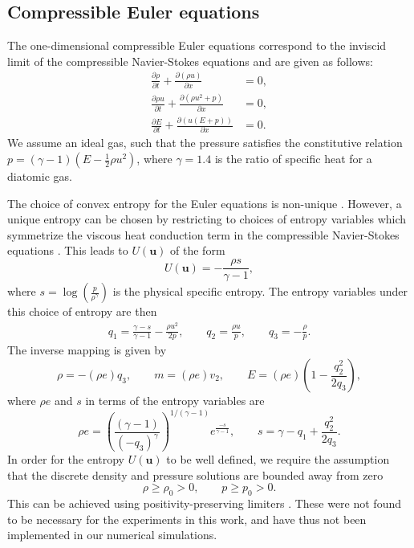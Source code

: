 \documentclass[preprint,10pt]{article}
\theoremstyle{definition}
\theoremstyle{lemma}
\theoremstyle{theorem}
\theoremstyle{assumption}
\newcommand{\pd}[2]{\frac{\partial#1}{\partial#2}}
\newcommand{\LRp}[1]{\left( #1 \right)}
\begin{document}
\subsection{Compressible Euler equations}

The one-dimensional compressible Euler equations correspond to the inviscid limit of the compressible Navier-Stokes equations and are given as follows:
\begin{align*}
\pd{\rho}{t} + \pd{\LRp{\rho u}}{x} &= 0,\\
\pd{\rho u}{t} + \pd{\LRp{\rho u^2 + p }}{x} &= 0,\\
\pd{E}{t} + \pd{\LRp{u(E+p)}}{x} &= 0.
\end{align*}
We assume an ideal gas, such that the pressure satisfies the constitutive relation $p = (\gamma-1)\LRp{E - \frac{1}{2}\rho u^2}$, where $\gamma = 1.4$ is the ratio of specific heat for a diatomic gas.    

The choice of convex entropy for the Euler equations is non-unique \cite{harten1983symmetric}.  However, a unique entropy can be chosen by restricting to choices of entropy variables which symmetrize the viscous heat conduction term in the compressible Navier-Stokes equations \cite{hughes1986new}.  This leads to $U(\bm{u})$ of the form
\[
U(\bm{u}) = -\frac{\rho s}{\gamma-1},
\]
where $s = \log\LRp{\frac{p}{\rho^\gamma}}$ is the physical specific entropy.  The entropy variables under this choice of entropy are then
\begin{align*}
q_1 = \frac{\gamma-s}{\gamma-1} - \frac{\rho u^2}{2p}, \qquad q_2 = \frac{\rho u}{p}, \qquad q_3 = -\frac{\rho}{p}.
\end{align*}
The inverse mapping is given by 
\[
\rho = -(\rho e) q_3, \qquad m = (\rho e) v_2, \qquad E = (\rho e)\LRp{1 - \frac{q_2^2}{2 q_3}},
\]
where $\rho e$ and $s$ in terms of the entropy variables are 
\[
\rho e = \LRp{\frac{(\gamma-1)}{\LRp{-q_3}^{\gamma}}}^{1/(\gamma-1)}e^{\frac{-s}{\gamma-1}}, \qquad s = \gamma - q_1 + \frac{q_2^2}{2q_3}.
\]
In order for the entropy $U(\bm{u})$ to be well defined, we require the assumption that the discrete density and pressure solutions are bounded away from zero
\begin{equation}
\rho \geq \rho_0 > 0,  \qquad p \geq p_0 > 0.  \label{eq:assumption2}
\end{equation}
This can be achieved using positivity-preserving limiters \cite{zhang2010positivity, zhang2012maximum}.  These were not found to be necessary for the experiments in this work, and have thus not been implemented in our numerical simulations.  
\end{document}
